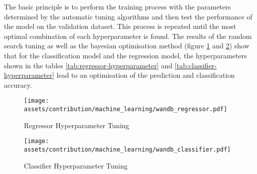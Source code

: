 \documentclass[a4paper, 12pt]{report}
\begin{document}
The basic principle is to perform the training process with the parameters determined by the automatic tuning algorithms and then test the performance of the model on the \gls{validation} dataset. This process is repeated until the most optimal combination of each hyperparameter is found. The results of the random search tuning as well as the \Gls{bayesian optimisation} method (figure \ref{fig:regressor-hyperparameter-tuning} and \ref{fig:classifier-hyperparameter-tuning}) show that for the classification model and the regression model, the hyperparameters shown in the tables \ref{tab:regressor-hyperparameter} and \ref{tab:classifier-hyperparameter} lead to an optimisation of the prediction and classification accuracy.

\begin{table}
\begin{center}
\end{center}
\caption{Regressor Hyperparameter}
\label{tab:regressor-hyperparameter}
\end{table}

\begin{figure}
\centering
\texttt{[image: assets/contribution/machine\_learning/wandb\_regressor.pdf]}
\caption{Regressor Hyperparameter Tuning}
\label{fig:regressor-hyperparameter-tuning}
\end{figure}

\begin{table}
\begin{center}
\end{center}
\caption{Classifier Hyperparameter}
\label{tab:classifier-hyperparameter}
\end{table}

\begin{figure}
\centering
\texttt{[image: assets/contribution/machine\_learning/wandb\_classifier.pdf]}
\caption{Classifier Hyperparameter Tuning}
\label{fig:classifier-hyperparameter-tuning}
\end{figure}
\end{document}
